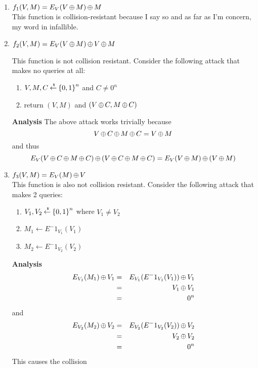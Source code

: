 \documentclass[11pt]{article}
\begin{document}
\begin{enumerate}
\item $f_1(V,M) = E_V(V {\,\oplus\,} M) {\,\oplus\,} M $\\

This function is collision-resistant because I say so and as far as I'm concern, my word in infallible.\\

\item $f_2(V,M) = E_V(V {\,\oplus\,} M) {\,\oplus\,} V {\,\oplus\,} M$



This function is not collision resistant. Consider the following attack that makes no queries at all:
\begin{enumerate}
\item $V, M, C {\:\stackrel{{\scriptscriptstyle \hspace{0.2em}\$}} {\leftarrow}\:} {\{0,1\}}^n$ and $C \neq 0^n$\\
\item return $(V, M)$ and $(V {\,\oplus\,} C, M {\,\oplus\,} C)$\\
\end{enumerate}

\textbf{Analysis}
The above attack works trivially because \\
\[
V {\,\oplus\,} C {\,\oplus\,} M {\,\oplus\,} C = V {\,\oplus\,} M
\]
and thus
\[
E_V(V {\,\oplus\,} C {\,\oplus\,} M {\,\oplus\,} C ) {\,\oplus\,} (V {\,\oplus\,} C {\,\oplus\,} M {\,\oplus\,} C ) = E_V(V {\,\oplus\,} M) {\,\oplus\,} (V {\,\oplus\,} M)
\]
\item $f_3(V,M) = E_V(M) {\,\oplus\,} V$
\\This function is also not collision resistant. Consider the following attack that makes 2 queries:\\
\begin{enumerate}
\item $V_1, V_2 {\:\stackrel{{\scriptscriptstyle \hspace{0.2em}\$}} {\leftarrow}\:} {\{0,1\}}^n$ where $V_1 \neq V_2$\\
\item $M_1 \gets E^-1_{V_1}(V_1)$\\
\item $M_2 \gets E^-1_{V_2}(V_2)$\\
\end{enumerate}

\textbf{Analysis}
\begin{eqnarray*}
E_{V_1}(M_1) {\,\oplus\,} V_1 &=& E_{V_1}(E^-1_{V_1}(V_1)) {\,\oplus\,} V_1 \\
&=& V_1 {\,\oplus\,} V_1 \\
&=& 0^n\\
\end{eqnarray*}
and
\begin{eqnarray*}
E_{V_2}(M_2) {\,\oplus\,} V_2 &=& E_{V_2}(E^-1_{V_2}(V_2)) {\,\oplus\,} V_2 \\
&=& V_2 {\,\oplus\,} V_2 \\
&=& 0^n\\
\end{eqnarray*}
This causes the collision\\
\end{enumerate}
\end{document}
